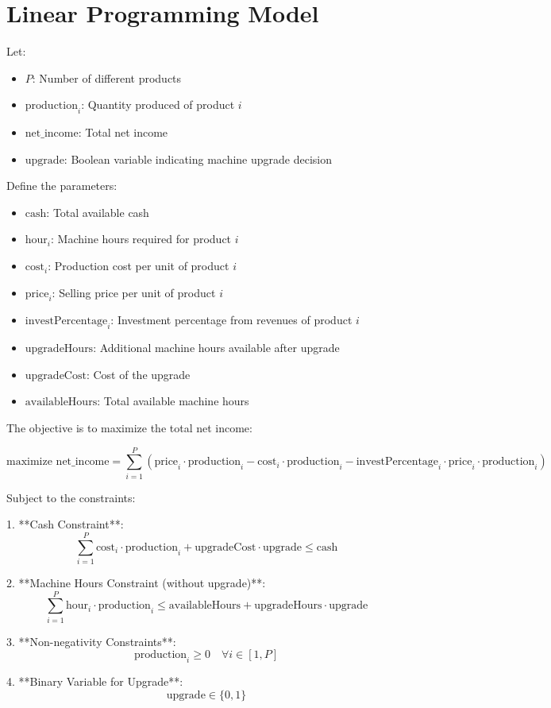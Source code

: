 \documentclass{article}
\begin{document}
\section*{Linear Programming Model}

Let:
\begin{itemize}
    \item \( P \): Number of different products
    \item \( \text{production}_i \): Quantity produced of product \( i \)
    \item \( \text{net\_income} \): Total net income
    \item \( \text{upgrade} \): Boolean variable indicating machine upgrade decision
\end{itemize}

Define the parameters:
\begin{itemize}
    \item \( \text{cash} \): Total available cash
    \item \( \text{hour}_i \): Machine hours required for product \( i \)
    \item \( \text{cost}_i \): Production cost per unit of product \( i \)
    \item \( \text{price}_i \): Selling price per unit of product \( i \)
    \item \( \text{investPercentage}_i \): Investment percentage from revenues of product \( i \)
    \item \( \text{upgradeHours} \): Additional machine hours available after upgrade
    \item \( \text{upgradeCost} \): Cost of the upgrade
    \item \( \text{availableHours} \): Total available machine hours
\end{itemize}

The objective is to maximize the total net income:

\[
\text{maximize } \text{net\_income} = \sum_{i=1}^{P} \left( \text{price}_i \cdot \text{production}_i - \text{cost}_i \cdot \text{production}_i - \text{investPercentage}_i \cdot \text{price}_i \cdot \text{production}_i \right)
\]

Subject to the constraints:

1. **Cash Constraint**:
\[
\sum_{i=1}^{P} \text{cost}_i \cdot \text{production}_i + \text{upgradeCost} \cdot \text{upgrade} \leq \text{cash}
\]

2. **Machine Hours Constraint (without upgrade)**:
\[
\sum_{i=1}^{P} \text{hour}_i \cdot \text{production}_i \leq \text{availableHours} + \text{upgradeHours} \cdot \text{upgrade}
\]

3. **Non-negativity Constraints**:
\[
\text{production}_i \geq 0 \quad \forall i \in [1, P]
\]

4. **Binary Variable for Upgrade**:
\[
\text{upgrade} \in \{0, 1\}
\]
\end{document}

